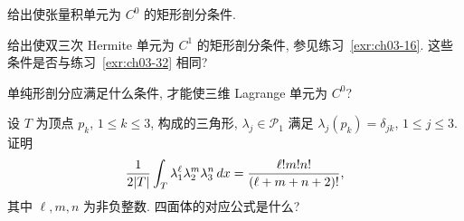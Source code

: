 \begin{MBExercise}
\label{exr:ch03-32}
给出使张量积单元为 $C^0$ 的矩形剖分条件.
\end{MBExercise}

\begin{MBExercise}
\label{exr:ch03-33}
给出使双三次 Hermite 单元为 $C^1$ 的矩形剖分条件, 参见练习~\ref{exr:ch03-16}. 这些条件是否与练习~\ref{exr:ch03-32} 相同?
\end{MBExercise}

\begin{MBExercise}
\label{exr:ch03-34}
单纯形剖分应满足什么条件, 才能使三维 Lagrange 单元为 $C^0$?
\end{MBExercise}

\begin{MBExercise}
\label{exr:ch03-35}
设 $T$ 为顶点 $p_k$, $1\leq k\leq3$, 构成的三角形, $\lambda_j\in\mathcal P_1$ 满足 $\lambda_j(p_k)=\delta_{jk}$, $1\leq j\leq3$. 证明
\[
\MathBookFormulaID{formula-ch03-exercise-35-barycentric-integral}
\frac1{2|T|}\int_T\lambda_1^\ell\lambda_2^m\lambda_3^n\,dx
=\frac{\ell!m!n!}{(\ell+m+n+2)!},
\]
其中 $\ell,m,n$ 为非负整数. 四面体的对应公式是什么?
\end{MBExercise}
